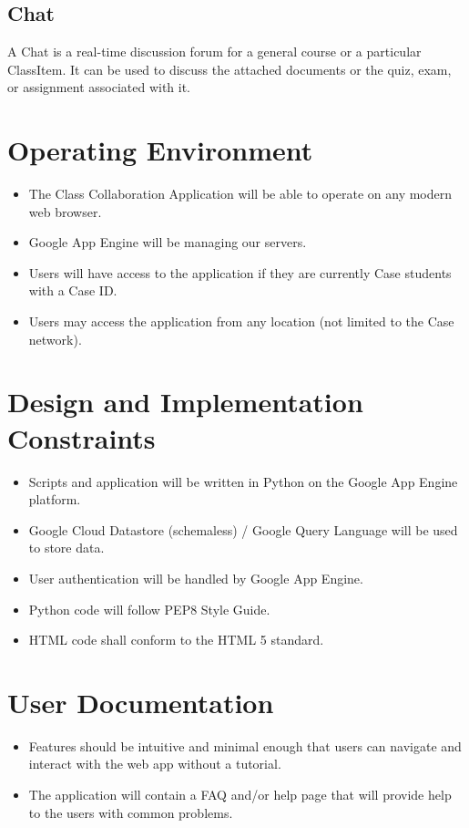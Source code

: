 \documentclass{scrreprt}
\begin{document}
\subsection{Chat}
A Chat is a real-time discussion forum for a general course or a particular ClassItem. It can be used to discuss the attached documents or the quiz, exam, or assignment associated with it.

\section{Operating Environment}
\begin{itemize}
	\item The Class Collaboration Application will be able to operate on any modern web browser.
	\item Google App Engine will be managing our servers.
	\item Users will have access to the application if they are currently Case students with a Case ID.
	\item Users may access the application from any location (not limited to the Case network).
\end{itemize}

\section{Design and Implementation Constraints}
\begin{itemize}
	\item Scripts and application will be written in Python on the Google App Engine platform.
	\item Google Cloud Datastore (schemaless) / Google Query Language will be used to store data.
	\item User authentication will be handled by Google App Engine.
	\item Python code will follow PEP8 Style Guide.
	\item HTML code shall conform to the HTML 5 standard.
\end{itemize}

\section{User Documentation}
\begin{itemize}
	\item Features should be intuitive and minimal enough that users can navigate and interact with the web app without a tutorial.
	\item The application will contain a FAQ and/or help page that will provide help to the users with common problems.
\end{itemize}
\end{document}
